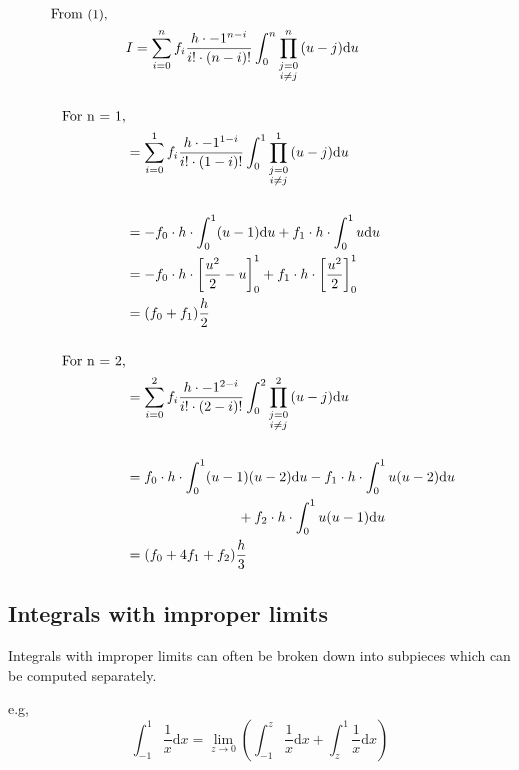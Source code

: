 \documentclass[12pt]{article}
\begin{document}
\begin{align*}
	\text{From \small{(1)}, } \quad\\
	&I = \sum_{i=0}^n f_i \frac{h \cdot -1^{n-i}}{i! \cdot (n-i)!} \int_{0}^{n} \prod \limits_{\substack{j=0 \\ i \not = j}}^n {(u - j)} \mathrm{d}u\\\\
	\text{For n = 1,}\\
	&= \sum_{i=0}^1 f_i \frac{h \cdot -1^{1-i}}{i! \cdot (1-i)!} \int_{0}^{1} \prod \limits_{\substack{j=0 \\ i \not = j}}^1 {(u - j)} \mathrm{d}u\\\\
	&= -f_0 \cdot h \cdot \int_0^1 (u - 1) \mathrm{d}u + f_1 \cdot h \cdot \int_0^1 u \mathrm{d}u\\
	&= -f_0 \cdot h \cdot \left[ \frac{u^2}{2} - u \right]_0^1 + f_1 \cdot h \cdot \left[\frac{u^2}{2} \right]_0^1\\
	&= (f_0 + f_1) \frac{h}{2}\\\\
	\text{For n = 2,}\\
	&= \sum_{i=0}^2 f_i \frac{h \cdot -1^{2-i}}{i! \cdot (2-i)!} \int_{0}^{2} \prod \limits_{\substack{j=0 \\ i \not = j}}^2 {(u - j)} \mathrm{d}u\\\\
	&= f_0 \cdot h \cdot \int_0^1 (u - 1)(u - 2) \mathrm{d}u - f_1 \cdot h \cdot \int_0^1 u(u - 2) \mathrm{d}u\\
	& \qquad\qquad\qquad\qquad+ f_2 \cdot h \cdot \int_0^1 u(u - 1) \mathrm{d}u\\
	&= (f_0 + 4f_1 + f_2) \frac{h}{3}\\
\end{align*}

\subsection*{Integrals with improper limits}

Integrals with improper limits can often be broken down into subpieces which can be computed separately.

e.g,
\begin{equation*}
	\int_{-1}^1 \frac{1}{x} \mathrm{d}x = \lim_{z \rightarrow 0} \left( \int_{-1}^{z} \frac{1}{x} \mathrm{d}x + \int_{z}^{1} \frac{1}{x} \mathrm{d}x \right)
\end{equation*}
\end{document}
